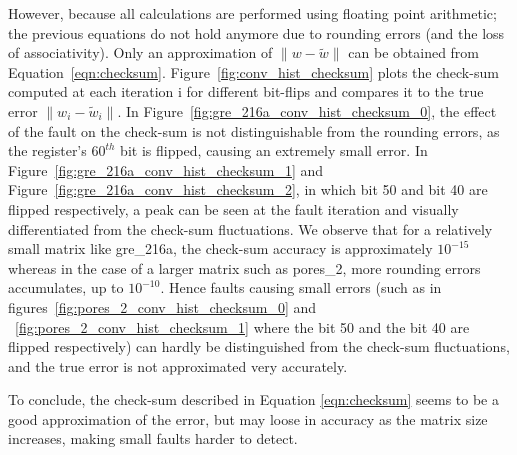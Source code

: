 However, because all calculations are performed using floating point arithmetic; the previous equations do not hold anymore due to rounding errors (and the loss of associativity).
Only an approximation of $\|w - \widetilde{w} \|$ can be obtained from Equation~\eqref{eqn:checksum}.
Figure~\ref{fig:conv_hist_checksum} plots the check-sum computed at each iteration i for different bit-flips and compares it to the true error $\|w_i - \widetilde{w}_i \|$. In Figure~\ref{fig:gre_216a_conv_hist_checksum_0}, the effect of the fault on the check-sum is not distinguishable from the rounding errors, as the register's $60^{th}$ bit is flipped, causing an extremely small error. In Figure~\ref{fig:gre_216a_conv_hist_checksum_1} and Figure~\ref{fig:gre_216a_conv_hist_checksum_2}, in which bit 50 and bit 40 are flipped respectively, a peak can be seen at the fault iteration and visually differentiated from the check-sum fluctuations. We observe that for a relatively small matrix like gre_216a, the check-sum accuracy is approximately $10^{-15}$ whereas in the case of a larger matrix such as pores_2, more rounding errors accumulates, up to $10^{-10}$. Hence faults causing small errors (such as in figures~\ref{fig:pores_2_conv_hist_checksum_0} and ~\ref{fig:pores_2_conv_hist_checksum_1} where the bit 50 and the bit 40 are flipped respectively) can hardly be distinguished from the check-sum fluctuations, and the true error is not approximated very accurately.

To conclude, the check-sum described in Equation \eqref{eqn:checksum} seems to be a good approximation of the error, but may loose in accuracy as the matrix size increases, making small faults harder to detect.



